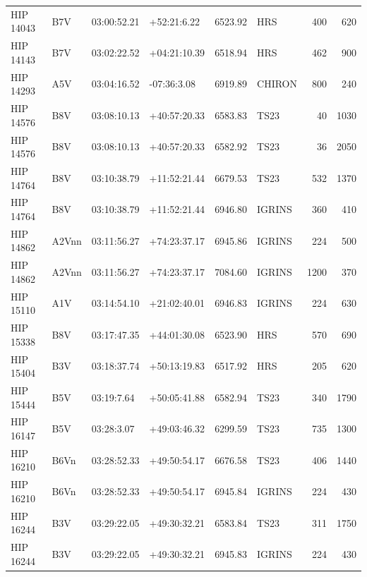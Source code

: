 \documentclass{emulateapj}
\begin{document}
\begin{longtable*}{|l|lllrlrr|}
   HIP 14043 &            B7V &    03:00:52.21 &    +52:21:6.22 &  6523.92 &        HRS &      400 &     620 \\
   HIP 14143 &            B7V &    03:02:22.52 &   +04:21:10.39 &  6518.94 &        HRS &      462 &     900 \\
   HIP 14293 &            A5V &    03:04:16.52 &    -07:36:3.08 &  6919.89 &     CHIRON &      800 &     240 \\
   HIP 14576 &            B8V &    03:08:10.13 &   +40:57:20.33 &  6583.83 &       TS23 &       40 &    1030 \\
   HIP 14576 &            B8V &    03:08:10.13 &   +40:57:20.33 &  6582.92 &       TS23 &       36 &    2050 \\
   HIP 14764 &            B8V &    03:10:38.79 &   +11:52:21.44 &  6679.53 &       TS23 &      532 &    1370 \\
   HIP 14764 &            B8V &    03:10:38.79 &   +11:52:21.44 &  6946.80 &     IGRINS &      360 &     410 \\
   HIP 14862 &          A2Vnn &    03:11:56.27 &   +74:23:37.17 &  6945.86 &     IGRINS &      224 &     500 \\
   HIP 14862 &          A2Vnn &    03:11:56.27 &   +74:23:37.17 &  7084.60 &     IGRINS &     1200 &     370 \\
   HIP 15110 &            A1V &    03:14:54.10 &   +21:02:40.01 &  6946.83 &     IGRINS &      224 &     630 \\
   HIP 15338 &            B8V &    03:17:47.35 &   +44:01:30.08 &  6523.90 &        HRS &      570 &     690 \\
   HIP 15404 &            B3V &    03:18:37.74 &   +50:13:19.83 &  6517.92 &        HRS &      205 &     620 \\
   HIP 15444 &            B5V &     03:19:7.64 &   +50:05:41.88 &  6582.94 &       TS23 &      340 &    1790 \\
   HIP 16147 &            B5V &     03:28:3.07 &   +49:03:46.32 &  6299.59 &       TS23 &      735 &    1300 \\
   HIP 16210 &           B6Vn &    03:28:52.33 &   +49:50:54.17 &  6676.58 &       TS23 &      406 &    1440 \\
   HIP 16210 &           B6Vn &    03:28:52.33 &   +49:50:54.17 &  6945.84 &     IGRINS &      224 &     430 \\
   HIP 16244 &            B3V &    03:29:22.05 &   +49:30:32.21 &  6583.84 &       TS23 &      311 &    1750 \\
   HIP 16244 &            B3V &    03:29:22.05 &   +49:30:32.21 &  6945.83 &     IGRINS &      224 &     430 \\

\end{longtable*}
\end{document}
